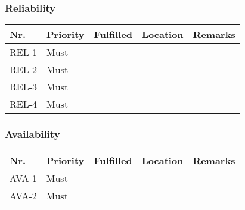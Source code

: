 	\subsubsection{Reliability}
	\begin{table}[H]
	\begin{tabular}{lllll}
	
	Nr.   & Priority & Fulfilled & Location & Remarks \\ \hline
	
	REL-1 & Must     & ~        & ~         & ~       \\ 
	
	REL-2 & Must     & ~        & ~         & ~       \\ 
	
	REL-3 & Must     & ~        & ~         & ~       \\ 
	
	REL-4 & Must     & ~        & ~         & ~       \\
	
	\end{tabular}
	\end{table}
	
	\subsubsection{Availability}
	\begin{table}[H]
	\begin{tabular}{lllll}
	
	Nr.   & Priority & Fulfilled & Location & Remarks \\ \hline
	
	AVA-1 & Must     & ~        & ~         & ~       \\ 
	
	AVA-2 & Must     & ~        & ~         & ~       \\
	
	\end{tabular}
	\end{table}
	
